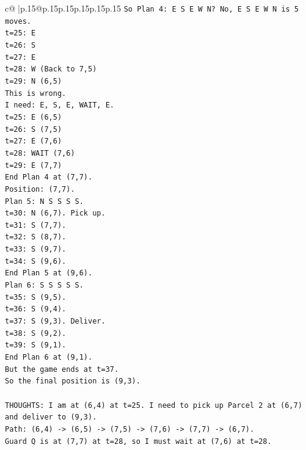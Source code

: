 \documentclass{article}
\begin{document}
{\begin{supertabular}{c@{$\;$}|p{.15\linewidth}@{}p{.15\linewidth}p{.15\linewidth}p{.15\linewidth}p{.15\linewidth}p{.15\linewidth}}
{{{\texttt{So Plan 4: E S E W N? No, E S E W N is 5 moves.} \\
\texttt{t=25: E} \\
\texttt{t=26: S} \\
\texttt{t=27: E} \\
\texttt{t=28: W (Back to 7,5)} \\
\texttt{t=29: N (6,5)} \\
\texttt{This is wrong.} \\
\texttt{I need: E, S, E, WAIT, E.} \\
\texttt{t=25: E (6,5)} \\
\texttt{t=26: S (7,5)} \\
\texttt{t=27: E (7,6)} \\
\texttt{t=28: WAIT (7,6)} \\
\texttt{t=29: E (7,7)} \\
\texttt{End Plan 4 at (7,7).} \\
\texttt{Position: (7,7).} \\
\texttt{Plan 5: N S S S S.} \\
\texttt{t=30: N (6,7). Pick up.} \\
\texttt{t=31: S (7,7).} \\
\texttt{t=32: S (8,7).} \\
\texttt{t=33: S (9,7).} \\
\texttt{t=34: S (9,6).} \\
\texttt{End Plan 5 at (9,6).} \\
\texttt{Plan 6: S S S S S.} \\
\texttt{t=35: S (9,5).} \\
\texttt{t=36: S (9,4).} \\
\texttt{t=37: S (9,3). Deliver.} \\
\texttt{t=38: S (9,2).} \\
\texttt{t=39: S (9,1).} \\
\texttt{End Plan 6 at (9,1).} \\
\texttt{But the game ends at t=37.} \\
\texttt{So the final position is (9,3).} \\
\\ 
\texttt{THOUGHTS: I am at (6,4) at t=25. I need to pick up Parcel 2 at (6,7) and deliver to (9,3).} \\
\texttt{Path: (6,4) {-}> (6,5) {-}> (7,5) {-}> (7,6) {-}> (7,7) {-}> (6,7).} \\
\texttt{Guard Q is at (7,7) at t=28, so I must wait at (7,6) at t=28.} \\
}}}
\end{supertabular}}
\end{document}
